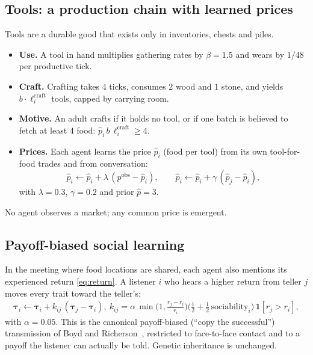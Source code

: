 \documentclass[11pt]{article}
\theoremstyle{definition}
\newcommand{\1}{\mathbf{1}}
\begin{document}
\subsection{Tools: a production chain with learned prices}\label{sec:tools}
Tools are a durable good that exists only in inventories, chests and piles.
\begin{itemize}
\item \textbf{Use.} A tool in hand multiplies gathering rates by $\beta=1.5$ and wears by $1/48$ per productive tick.
\item \textbf{Craft.} Crafting takes $4$ ticks, consumes $2$ wood and $1$ stone, and yields $b\cdot\ell^{\text{craft}}_i$ tools, capped by carrying room.
\item \textbf{Motive.} An adult crafts if it holds no tool, or if one batch is believed to fetch at least $4$ food: $\hat p_i\, b\,\ell^{\text{craft}}_i \ge 4$.
\item \textbf{Prices.} Each agent learns the price $\hat p_i$ (food per tool) from its own tool-for-food trades and from conversation:
\begin{equation}
\hat p_i \leftarrow \hat p_i + \lambda\,(p^{\text{obs}} - \hat p_i),\qquad
\hat p_i \leftarrow \hat p_i + \gamma\,(\hat p_j - \hat p_i),
\end{equation}
with $\lambda=0.3$, $\gamma=0.2$ and prior $\hat p=3$.
\end{itemize}
No agent observes a market; any common price is emergent.

\subsection{Payoff-biased social learning}\label{sec:culture}
In the meeting where food locations are shared, each agent also mentions its experienced return \eqref{eq:return}. A listener $i$ who hears a higher return from teller $j$ moves every trait toward the teller's:
\begin{gather}
\boldsymbol{\tau}_i \leftarrow \boldsymbol{\tau}_i + k_{ij}\,(\boldsymbol{\tau}_j - \boldsymbol{\tau}_i),\
k_{ij} = \alpha\,\min\!\Big(1,\frac{r_j - r_i}{r_i}\Big)\big(\tfrac12 + \tfrac12\,\text{sociability}_i\big)\,\1[r_j>r_i],
\label{eq:culture}
\end{gather}
with $\alpha = 0.05$. This is the canonical payoff-biased (``copy the successful'') transmission of Boyd and Richerson~\cite{boyd1985}, restricted to face-to-face contact and to a payoff the listener can actually be told. Genetic inheritance is unchanged.
\end{document}
